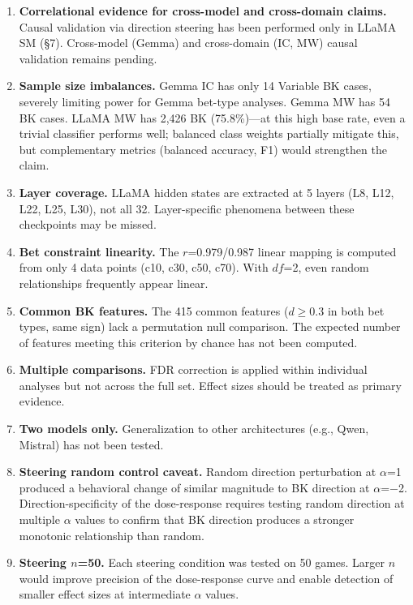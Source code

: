 \documentclass[11pt,a4paper]{article}
\begin{document}
\begin{enumerate}[leftmargin=2em]
    \item \textbf{Correlational evidence for cross-model and cross-domain claims.} Causal validation via direction steering has been performed only in LLaMA SM (\S7). Cross-model (Gemma) and cross-domain (IC, MW) causal validation remains pending.

    \item \textbf{Sample size imbalances.} Gemma IC has only 14 Variable BK cases, severely limiting power for Gemma bet-type analyses. Gemma MW has 54 BK cases. LLaMA MW has 2{,}426 BK (75.8\%)---at this high base rate, even a trivial classifier performs well; balanced class weights partially mitigate this, but complementary metrics (balanced accuracy, F1) would strengthen the claim.

    \item \textbf{Layer coverage.} LLaMA hidden states are extracted at 5 layers (L8, L12, L22, L25, L30), not all 32. Layer-specific phenomena between these checkpoints may be missed.

    \item \textbf{Bet constraint linearity.} The $r$=0.979/0.987 linear mapping is computed from only 4 data points (c10, c30, c50, c70). With $df$=2, even random relationships frequently appear linear.

    \item \textbf{Common BK features.} The 415 common features ($d$$\geq$0.3 in both bet types, same sign) lack a permutation null comparison. The expected number of features meeting this criterion by chance has not been computed.

    \item \textbf{Multiple comparisons.} FDR correction is applied within individual analyses but not across the full set. Effect sizes should be treated as primary evidence.

    \item \textbf{Two models only.} Generalization to other architectures (e.g., Qwen, Mistral) has not been tested.

    \item \textbf{Steering random control caveat.} Random direction perturbation at $\alpha$=1 produced a behavioral change of similar magnitude to BK direction at $\alpha$=$-$2. Direction-specificity of the dose-response requires testing random direction at multiple $\alpha$ values to confirm that BK direction produces a stronger monotonic relationship than random.

    \item \textbf{Steering $n$=50.} Each steering condition was tested on 50 games. Larger $n$ would improve precision of the dose-response curve and enable detection of smaller effect sizes at intermediate $\alpha$ values.
\end{enumerate}
\end{document}
